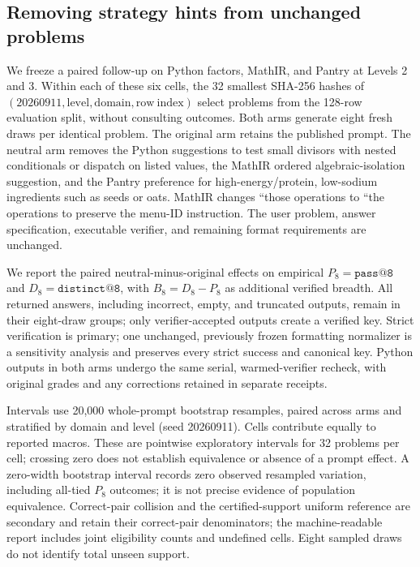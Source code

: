 \subsection{Removing strategy hints from unchanged problems}

\label{sec:prompt-hint-ablation}

We freeze a paired follow-up on Python factors, MathIR, and Pantry at Levels 2 and 3. Within each of these six cells, the 32 smallest SHA-256 hashes of $(20260911,\mathrm{level},\mathrm{domain},\mathrm{row\ index})$ select problems from the 128-row evaluation split, without consulting outcomes. Both arms generate eight fresh draws per identical problem. The original arm retains the published prompt. The neutral arm removes the Python suggestions to test small divisors with nested conditionals or dispatch on listed values, the MathIR ordered algebraic-isolation suggestion, and the Pantry preference for high-energy/protein, low-sodium ingredients such as seeds or oats. MathIR changes ``those operations to ``the operations to preserve the menu-ID instruction. The user problem, answer specification, executable verifier, and remaining format requirements are unchanged.

We report the paired neutral-minus-original effects on empirical $P_8=\texttt{pass@8}$ and $D_8=\texttt{distinct@8}$, with $B_8=D_8-P_8$ as additional verified breadth. All returned answers, including incorrect, empty, and truncated outputs, remain in their eight-draw groups; only verifier-accepted outputs create a verified key. Strict verification is primary; one unchanged, previously frozen formatting normalizer is a sensitivity analysis and preserves every strict success and canonical key. Python outputs in both arms undergo the same serial, warmed-verifier recheck, with original grades and any corrections retained in separate receipts.

Intervals use 20,000 whole-prompt bootstrap resamples, paired across arms and stratified by domain and level (seed 20260911). Cells contribute equally to reported macros. These are pointwise exploratory intervals for 32 problems per cell; crossing zero does not establish equivalence or absence of a prompt effect. A zero-width bootstrap interval records zero observed resampled variation, including all-tied $P_8$ outcomes; it is not precise evidence of population equivalence. Correct-pair collision and the certified-support uniform reference are secondary and retain their correct-pair denominators; the machine-readable report includes joint eligibility counts and undefined cells. Eight sampled draws do not identify total unseen support.



